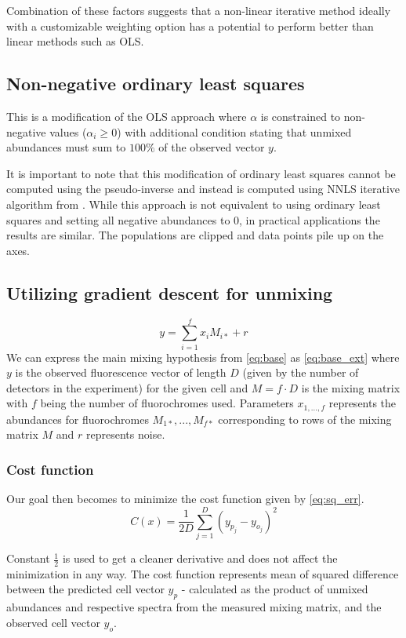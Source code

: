 Combination of these factors suggests that a non-linear iterative method ideally with a customizable weighting option has a potential to perform better than linear methods such as OLS. 

\subsection{Non-negative ordinary least squares}
This is a modification of the OLS approach where $\alpha$ is constrained to non-negative values ($\alpha_i\geq0$) with additional condition stating that unmixed abundances must sum to $100\%$ of the observed vector $y$.\cite{unmix2013nonsq}

It is important to note that this modification of ordinary least squares cannot be computed using the pseudo-inverse and instead is computed using NNLS iterative algorithm from \cite{Bro1997AFN}.
While this approach is not equivalent to using ordinary least squares and setting all negative abundances to 0, in practical applications the results are similar. The populations are clipped and data points pile up on the axes.\cite{unmix2013nonsq}

\subsection{Utilizing gradient descent for unmixing}
\begin{equation}
y=\sum_{i=1}^f x_iM_{i*}+r
\label{eq:base_ext}
\end{equation}
We can express the main mixing hypothesis from \cref{eq:base} as \cref{eq:base_ext} where $y$ is the observed fluorescence vector of length $D$ (given by the number of detectors in the experiment) for the given cell and $M=f \cdot D$ is the mixing matrix with $f$ being the number of fluorochromes used. 
Parameters $x_{1,...,f}$ represents the abundances for fluorochromes $M_{1*},...,M_{f*}$ corresponding to rows of the mixing matrix $M$ and $r$ represents noise.
\subsubsection{Cost function}
Our goal then becomes to minimize the cost function given by \cref{eq:sq_err}.
\begin{equation}
C(x)=\frac{1}{2D}\sum_{j=1}^{D}(y_{p_j}-y_{o_j})^2
\label{eq:sq_err}
\end{equation}

Constant $\frac{1}{2}$ is used to get a cleaner derivative and does not affect the minimization in any way. The cost function represents mean of squared difference between the predicted cell vector $y_p$ - calculated as the product of unmixed abundances and respective spectra from the measured mixing matrix, and the observed cell vector $y_o$.

